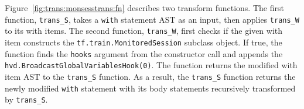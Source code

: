 Figure~\ref{fig:trans:monsesstrans:fn} describes two transform functions. The
first function, {\tt trans\_S}, takes a {\tt with} statement AST as an input,
then applies {\tt trans\_W} to its with items. 
The second function, {\tt trans\_W}, first checks if the given with item  
constructs the {\tt tf.train.MonitoredSession} subclass object.
If true, the function finds the {\tt hooks} argument from the constructor call
and appends the {\tt hvd.BroadcastGlobalVariablesHook(0)}.
The function returns the modified with item AST to the {\tt trans\_S} function.
As a result, the {\tt trans\_S} function returns the newly modified {\tt with}
statement with its body statements recursively transformed by {\tt trans\_S}.

% 
% 
% 
